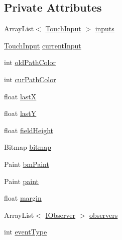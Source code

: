 \subsection*{Private Attributes}
\begin{DoxyCompactItemize}
\item 
ArrayList$<$ \hyperlink{classch_1_1zhaw_1_1ba10__bsha__1_1_1ime_1_1TouchInput}{TouchInput} $>$ \hyperlink{classch_1_1zhaw_1_1ba10__bsha__1_1_1ime_1_1PadView_a73761fbcb4c8d5848fa88f6293d12519}{inputs}
\item 
\hyperlink{classch_1_1zhaw_1_1ba10__bsha__1_1_1ime_1_1TouchInput}{TouchInput} \hyperlink{classch_1_1zhaw_1_1ba10__bsha__1_1_1ime_1_1PadView_a6ff45debae1b93ccc68f309c62fe6885}{currentInput}
\item 
int \hyperlink{classch_1_1zhaw_1_1ba10__bsha__1_1_1ime_1_1PadView_ac399fffb0a2e777ca6089ad4e713e76c}{oldPathColor}
\item 
int \hyperlink{classch_1_1zhaw_1_1ba10__bsha__1_1_1ime_1_1PadView_a9fdc4e6d121c7b8d5466b5f0148a6be6}{curPathColor}
\item 
float \hyperlink{classch_1_1zhaw_1_1ba10__bsha__1_1_1ime_1_1PadView_ab132a8e8a4f00924500f87483cff2a98}{lastX}
\item 
float \hyperlink{classch_1_1zhaw_1_1ba10__bsha__1_1_1ime_1_1PadView_a2e3aa9d507464cf235778e66baea84a0}{lastY}
\item 
float \hyperlink{classch_1_1zhaw_1_1ba10__bsha__1_1_1ime_1_1PadView_a2d40bd61174101fd313d5964a0ae0ab2}{fieldHeight}
\item 
Bitmap \hyperlink{classch_1_1zhaw_1_1ba10__bsha__1_1_1ime_1_1PadView_aa24b63a808cf4edc3dc57a42b5d71892}{bitmap}
\item 
Paint \hyperlink{classch_1_1zhaw_1_1ba10__bsha__1_1_1ime_1_1PadView_a9113cabd4a9c66b85a2224ff87c7756a}{bmPaint}
\item 
Paint \hyperlink{classch_1_1zhaw_1_1ba10__bsha__1_1_1ime_1_1PadView_a1122cb9b4a18be3bb5f96d56dea23ad6}{paint}
\item 
float \hyperlink{classch_1_1zhaw_1_1ba10__bsha__1_1_1ime_1_1PadView_af25e748299c5bc4816c615f180306695}{margin}
\item 
ArrayList$<$ \hyperlink{interfacech_1_1zhaw_1_1ba10__bsha__1_1_1ime_1_1IObserver}{IObserver} $>$ \hyperlink{classch_1_1zhaw_1_1ba10__bsha__1_1_1ime_1_1PadView_acb98feb9db4b3995ee755d986679428d}{observers}
\item 
int \hyperlink{classch_1_1zhaw_1_1ba10__bsha__1_1_1ime_1_1PadView_a4884ead1ce1948227083986cb75b6a0a}{eventType}
\end{DoxyCompactItemize}
